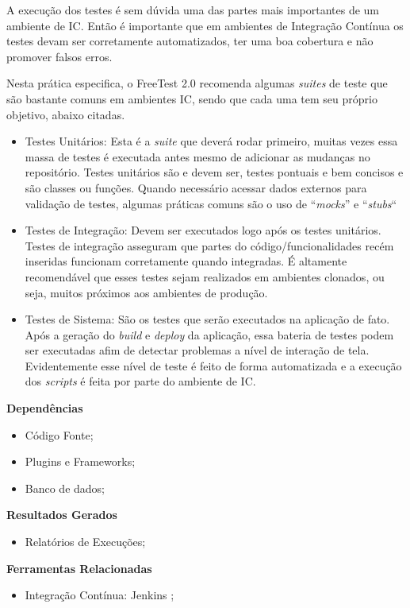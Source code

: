 A execução dos testes é sem dúvida uma das partes mais importantes de um ambiente de IC. Então é importante que em ambientes de Integração Contínua os testes devam ser corretamente automatizados, ter uma boa cobertura e não promover falsos erros.

Nesta prática especifica, o FreeTest 2.0 recomenda algumas \textit{suites} de teste que são bastante comuns em ambientes IC, sendo que cada uma tem seu próprio objetivo, abaixo citadas.

\begin{itemize}
	\item Testes Unitários: Esta é a \textit{suite} que deverá rodar primeiro, muitas vezes essa massa de testes é executada antes mesmo de adicionar as mudanças no repositório. Testes unitários são e devem ser, testes pontuais e bem concisos e são classes ou funções. Quando necessário acessar dados externos para validação de testes, algumas práticas comuns são o uso de “\textit{mocks}” e “\textit{stubs}“
	\item Testes de Integração: Devem ser executados logo após os testes unitários. Testes de integração asseguram que partes do código/funcionalidades recém inseridas funcionam corretamente quando integradas. É altamente recomendável que esses testes sejam realizados em ambientes clonados, ou seja, muitos próximos aos ambientes de produção.
	\item Testes de Sistema: São os testes que serão executados na aplicação de fato. Após a geração do \textit{build} e \textit{deploy} da aplicação, essa bateria de testes podem ser executadas afim de detectar problemas a nível de interação de tela. Evidentemente esse nível de teste é feito de forma automatizada e a execução dos \textit{scripts} é feita por parte do ambiente de IC.
\end{itemize}

\textbf{Dependências}
\begin{itemize}
    \item Código Fonte;
    \item Plugins e Frameworks;
    \item Banco de dados;
\end{itemize}

\textbf{ Resultados Gerados}
\begin{itemize}
    \item Relatórios de Execuções;
\end{itemize}

\textbf{ Ferramentas Relacionadas}
\begin{itemize}
    \item Integração Contínua: Jenkins \cite{Jenkins};
\end{itemize}

